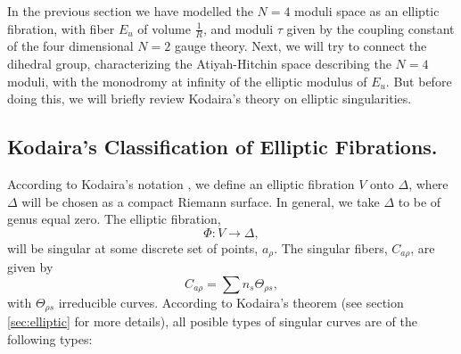 In the previous section we have modelled the $N=4$ moduli space
as an elliptic fibration, with fiber $E_u$ of volume $\frac
{1}{R}$, and moduli $\tau$ given by the coupling constant of the
four dimensional $N=2$ gauge theory. Next, we will try to connect
the dihedral group, characterizing the Atiyah-Hitchin space
describing the $N=4$ moduli, with the monodromy at infinity of
the elliptic modulus of $E_u$. But before doing this, we will
briefly review Kodaira's theory on elliptic singularities.

\subsection{Kodaira's Classification of Elliptic Fibrations.}

According to Kodaira's notation \cite{Kodaira}, we define an elliptic fibration
$V$ onto $\Delta$, where $\Delta$ will be chosen as a compact
Riemann surface. In general, we take $\Delta$ to be of genus
equal zero. The elliptic fibration,
\begin{equation}
\Phi: V \rightarrow \Delta,
\label{eq:II60}
\end{equation}
will be singular at some discrete set of points, $a_{\rho}$. The
singular fibers, $C_{a\rho}$, are given by
\begin{equation}
C_{a\rho} = \sum n_{s} \Theta_{\rho s},
\label{eq:II61}
\end{equation}
with $\Theta_{\rho s}$ irreducible curves. According to Kodaira's
theorem (see section \ref{sec:elliptic} for more details), all posible types of singular curves are of the
following types:
